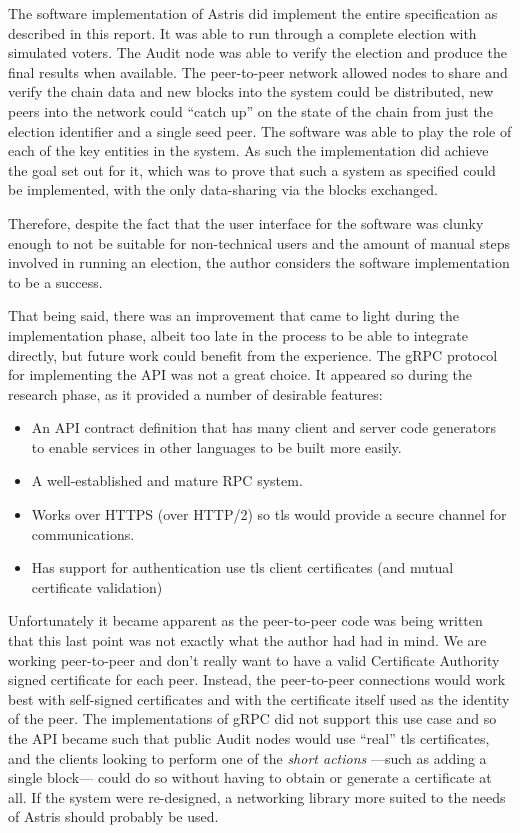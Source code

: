 The software implementation of Astris did implement the entire specification as described in this report. It was able to run through a complete election with simulated voters. The Audit node was able to verify the election and produce the final results when available. The peer-to-peer network allowed nodes to share and verify the chain data and new blocks into the system could be distributed, new peers into the network could ``catch up'' on the state of the chain from just the election identifier and a single seed peer. The software was able to play the role of each of the key entities in the system. As such the implementation did achieve the goal set out for it, which was to prove that such a system as specified could be implemented, with the only data-sharing via the blocks exchanged.

Therefore, despite the fact that the user interface for the software was clunky enough to not be suitable for non-technical users and the amount of manual steps involved in running an election, the author considers the software implementation to be a success.

That being said, there was an improvement that came to light during the implementation phase, albeit too late in the process to be able to integrate directly, but future work could benefit from the experience. The gRPC protocol for implementing the API was not a great choice. It appeared so during the research phase, as it provided a number of desirable features:

\begin{itemize}
    \item An API contract definition that has many client and server code generators to enable services in other languages to be built more easily.
    \item A well-established and mature RPC system.
    \item Works over HTTPS (over HTTP/2) so \gls{tls} would provide a secure channel for communications.
    \item Has support for authentication use \gls{tls} client certificates (and mutual certificate validation)
\end{itemize}

Unfortunately it became apparent as the peer-to-peer code was being written that this last point was not exactly what the author had had in mind. We are working peer-to-peer and don't really want to have a valid Certificate Authority signed certificate for each peer. Instead, the peer-to-peer connections would work best with self-signed certificates and with the certificate itself used as the identity of the peer. The implementations of gRPC did not support this use case and so the API became such that public Audit nodes would use ``real'' \gls{tls} certificates, and the clients looking to perform one of the \emph{short actions} ---such as adding a single block--- could do so without having to obtain or generate a certificate at all. If the system were re-designed, a networking library more suited to the needs of Astris should probably be used.
